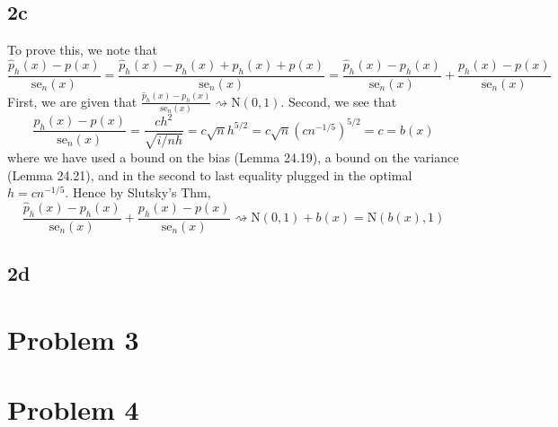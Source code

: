 \documentclass[12pt]{article}
\begin{document}
\subsection*{2c}
To prove this, we note that
\begin{equation}
    \frac{\hat{p}_h(x) - p(x)}{\text{se}_n(x)}
        = \frac{\hat{p}_h(x) - p_h(x) + p_h(x) + p(x)}{\text{se}_n(x)}
        = \frac{\hat{p}_h(x) - p_h(x)}{\text{se}_n(x)} + \frac{p_h(x) - p(x)}{\text{se}_n(x)}
\end{equation}
First, we are given that $\frac{\hat{p}_h(x) - p_h(x)}{\text{se}_n(x)} \rightsquigarrow \text{N}(0,1)$. Second, we see that
\begin{equation}
    \frac{p_h(x) - p(x)}{\text{se}_n(x)} = \frac{ch^2}{\sqrt{i/nh}} = c\sqrt{n}h^{5/2} = c\sqrt{n}\left(cn^{-1/5}\right)^{5/2} = c = b(x)
\end{equation}
where we have used a bound on the bias (Lemma 24.19), a bound on the variance (Lemma 24.21), and in the second to last 
equality plugged in the optimal $h = cn^{-1/5}$. Hence by Slutsky's Thm, 
\begin{equation}
    \frac{\hat{p}_h(x) - p_h(x)}{\text{se}_n(x)} + \frac{p_h(x) - p(x)}{\text{se}_n(x)}
    \rightsquigarrow \text{N}(0,1) + b(x) = \text{N}(b(x),1)
\end{equation}

\subsection*{2d}


\section*{Problem 3}
\label{sec:prob3}


\section*{Problem 4}
\label{sec:prob4}
\end{document}
